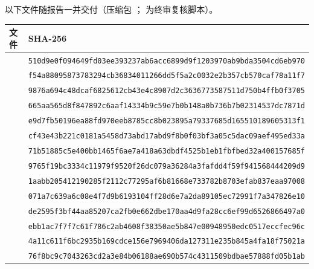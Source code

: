 以下文件随报告一并交付（压缩包 ； 为终审复核脚本）。

{\scriptsize\begin{longtable}{L{0.36\textwidth}L{0.58\textwidth}}
\toprule 文件 & SHA-256\\\midrule\endhead
{} & \texttt{510d9e0f094649fd03ee393237ab6acc}\allowbreak\texttt{6899d9f1203970ab9bda3504cd6eb970}\\
 & \texttt{f54a88095873783294cb36834011266d}\allowbreak\texttt{d5f5a2c0032e2b357cb570caf78a11f7}\\
 & \texttt{9876a694c48dcaf6825612cb43e4c890}\allowbreak\texttt{7d2c3636773587511d750b4ffb0f3705}\\
 & \texttt{665aa565d8f847892c6aaf14334b9c59}\allowbreak\texttt{e7b0b148a0b736b7b02314537dc7871d}\\
 & \texttt{e9d7fb50196ea88fd970eeb8785cc8b0}\allowbreak\texttt{23895a79337685d165510189605313f1}\\
 & \texttt{cf43e43b221c0181a5458d73abd17abd}\allowbreak\texttt{9f8b0f03bf3a05c5dac09aef495ed33a}\\
 & \texttt{71b51885c5e400bb1465f6ae7a418a63}\allowbreak\texttt{dbdf4525b1eb1fbfbed32a400157685f}\\
 & \texttt{9765f19bc3334c11979f9520f26dc079}\allowbreak\texttt{a36284a3fafdd4f59f941568444209d9}\\
 & \texttt{1aabb205412190285f2112c77295af6b}\allowbreak\texttt{81668e733782b8703efab837eaa97008}\\
 & \texttt{071a7c639a6c08e4f7d9b6193104ff28}\allowbreak\texttt{d6e7a2da89105ec72991f7a347826e10}\\
 & \texttt{de2595f3bf44aa85207ca2fb0e662dbe}\allowbreak\texttt{170aa4d9fa28cc6ef99d6526866497a0}\\
 & \texttt{ebb1ac7f7f7c61f786c2ab4608f38350}\allowbreak\texttt{ae5b847e00948950edc0517eccfec96c}\\
 & \texttt{4a11c611f6bc2935b169cdce156e7969}\allowbreak\texttt{406da127311e235b845a4fa18f75021a}\\
 & \texttt{76f8bc9c7043263cd2a3e84b06188ae6}\allowbreak\texttt{90b574c4311509bdbae57888fd05b1ab}\\

\end{longtable}}
